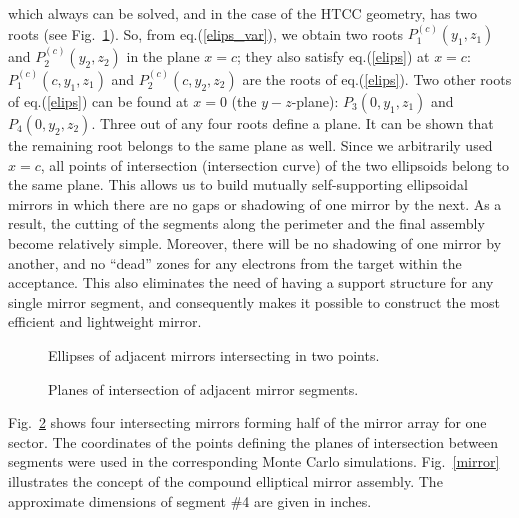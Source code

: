 \noindent
which always can be solved, and in the case of the HTCC geometry, has 
two roots (see Fig.~\ref{figelips}). So, from eq.(\ref{elips_var}),  
we obtain two roots $P_1^{(c)}(y_1,z_1)$ and $P_2^{(c)}(y_2,z_2)$ 
in the plane $x = c$; they also satisfy eq.(\ref{elips}) at $x = c$: 
$P_1^{(c)}(c,y_1,z_1)$ and $P_2^{(c)}(c,y_2,z_2)$ are the roots of 
eq.(\ref{elips}).  Two other roots of eq.(\ref{elips}) can be found at 
$x=0$ (the $y-z$-plane): $P_3(0,y_1,z_1)$ and $P_4(0,y_2,z_2)$.  Three out 
of any four roots define a plane.  It can be shown that the remaining 
root belongs to the same plane as well.  Since we arbitrarily used $x = c$,  
all points of intersection (intersection curve) of the two ellipsoids belong
to the same plane.  This allows us to build mutually self-supporting
ellipsoidal mirrors in which there are no gaps or shadowing of one mirror by 
the next.  As a result, the cutting of the segments along the perimeter and
the final assembly become relatively simple. Moreover, there will be no 
shadowing of one mirror by another, and no ``dead'' zones for any electrons 
from the target within the acceptance.  This also eliminates the need of 
having a support structure for any single mirror segment, and consequently 
makes it possible to construct the most efficient and lightweight mirror. 

\begin{figure}
\begin{center}
\caption{\small{Ellipses of adjacent mirrors intersecting in two points.}}
\label{figelips}
\end{center}
\end{figure} 
\begin{figure}
\begin{center}
\caption{\small{Planes of intersection of adjacent mirror segments.}}
\label{planes}
\end{center}
\end{figure} 

Fig.~\ref{planes} shows four intersecting mirrors forming half of the mirror  
array for one sector.  The coordinates of the points defining the planes of 
intersection between segments were used in the corresponding Monte Carlo 
simulations.  Fig.~\ref{mirror} illustrates the concept of the compound 
elliptical mirror assembly.  The approximate dimensions of segment \#4 
are given in inches.


